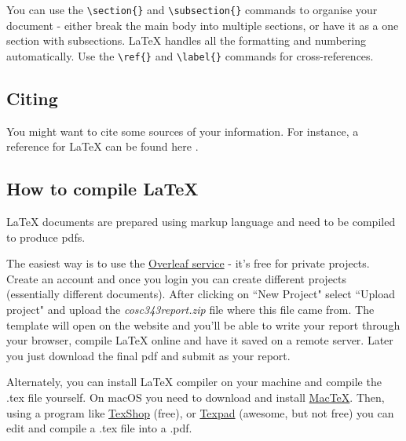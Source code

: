 \documentclass[12pt]{article}
\begin{document}
\begin{itemize}
\begin{itemize}
      \end{itemize}
\end{itemize}

You can use the \verb$\section{}$ and \verb$\subsection{}$ commands to organise your document - either break the main body into multiple sections, or have it as a one section with subsections.   \LaTeX{} handles all the formatting and numbering automatically. Use the \verb$\ref{}$ and \verb$\label{}$ commands for cross-references.  

\subsection{Citing}

You might want to cite some sources of your information.  For instance, a reference for \LaTeX{} can be found here \cite{latexcompanion}.

\subsection{How to compile \LaTeX{}}

\LaTeX{} documents are prepared using markup language and need to be compiled to produce pdfs.  

The easiest way is to use the \href{https://www.overleaf.com}{Overleaf service} - it's free for private projects.  Create an account and once you login you can create different projects (essentially different documents).  After clicking on ``New Project" select ``Upload project" and upload the \textit{cosc343report.zip} file where this file came from.  The template will open on the website and you'll be able to write your report through your browser, compile LaTeX online and have it saved on a remote server.  Later you just download the final pdf and submit as your report.    

Alternately, you can install LaTeX compiler on your machine and compile the .tex file yourself.  On macOS you need to download and install \href{http://www.tug.org/mactex/downloading.html}{MacTeX}.  Then, using a program like \href{http://pages.uoregon.edu/koch/texshop/}{TexShop} (free), or \href{https://www.texpad.com/}{Texpad} (awesome, but not free) you can edit and compile a .tex file into a .pdf.
\end{document}
